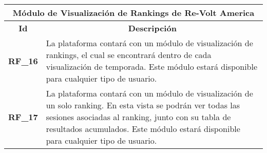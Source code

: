 \begin{center}
	\begin{tabular}{ | l | p{15cm} |}
		\hline
		\multicolumn{2}{|c|}{\textbf{Módulo de Visualización de Rankings de Re-Volt America}} \\
		\hline
		\multicolumn{1}{|c|}{\textbf{Id}} & \multicolumn{1}{|c|}{\textbf{Descripción}} \\
		\hline
		
		{\textbf{RF\_16}} & La plataforma contará con un módulo de visualización de rankings, el cual se encontrará dentro de cada visualización de temporada. Este módulo estará disponible para cualquier tipo de usuario. \\ \hline
		
		{\textbf{RF\_17}} & La plataforma contará con un módulo de visualización de un solo ranking. En esta vista se podrán ver todas las sesiones asociadas al ranking, junto con su tabla de resultados acumulados. Este módulo estará disponible para cualquier tipo de usuario. \\ \hline
	\end{tabular}
  
  \label{table:rf:rankings}
\end{center}


